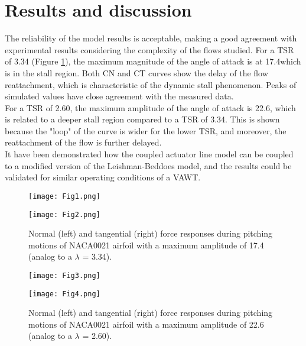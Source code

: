 \documentclass[a4paper]{jpconf}
\begin{document}
\section{Results and discussion}
The reliability of the model results is acceptable, making a good agreement with experimental results considering the complexity of the flows studied. For a TSR of 3.34 (Figure \ref{fig1}), the maximum magnitude of the angle of attack is at 17.4\degree which is in the stall region. Both CN and CT curves show the delay of the flow reattachment, which is characteristic of the dynamic stall phenomenon. Peaks of simulated values have close agreement with the measured data.\\
For a TSR of 2.60, the maximum amplitude of the angle of attack is 22.6, which is related to a deeper stall region compared to a TSR of 3.34. This is shown because the "loop" of the curve is wider for the lower TSR, and moreover, the reattachment of the flow is further delayed.\\
It have been demonstrated how the coupled actuator line model can be coupled to a modified version of the Leishman-Beddoes model, and the results could be validated for similar operating conditions of a VAWT. 



\begin{figure}[h]
\begin{minipage}{18pc}
\texttt{[image: Fig1.png]}
\end{minipage}\hspace{2pc}%
\begin{minipage}{18pc}
\texttt{[image: Fig2.png]}
\end{minipage} 
\caption{\label{fig1}Normal (left) and tangential (right) force responses during pitching motions of NACA0021 airfoil with a maximum amplitude of 17.4 \degree (analog to a $\lambda$ = 3.34).}
\end{figure}


\begin{figure}[h]
\begin{minipage}{18pc}
\texttt{[image: Fig3.png]}
\end{minipage}\hspace{2pc}%
\begin{minipage}{18pc}
\texttt{[image: Fig4.png]}
\end{minipage} 
\caption{\label{fig2}Normal (left) and tangential (right) force responses during pitching motions of NACA0021 airfoil with a maximum amplitude of 22.6 \degree (analog to a $\lambda$ = 2.60).}
\end{figure}
\end{document}

